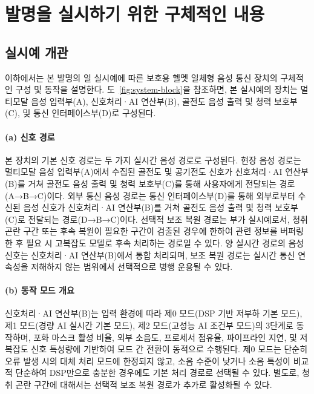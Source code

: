 \documentclass{article}
\DeclareRobustCommand{\codexedit}[1]{\textcolor{customorange}{#1}}
\begin{document}
\clearpage

\section{발명을 실시하기 위한 구체적인 내용}


\subsection{실시예 개관}

이하에서는 본 발명의 일 실시예에 따른 보호용 헬멧 일체형 음성 통신 장치의 구체적인 구성 및 동작을 설명한다. 도~\ref{fig:system-block}을 참조하면, 본 실시예의 장치는 멀티모달 음성 입력부(A), 신호처리·AI 연산부(B), 골전도 음성 출력 및 청력 보호부(C), 및 통신 인터페이스부(D)로 구성된다.

\paragraph{(a) 신호 경로}

\codexedit{본 장치의 기본 신호 경로는 두 가지 실시간 음성 경로로 구성된다. 현장 음성 경로는 멀티모달 음성 입력부(A)에서 수집된 골전도 및 공기전도 신호가 신호처리·AI 연산부(B)를 거쳐 골전도 음성 출력 및 청력 보호부(C)를 통해 사용자에게 전달되는 경로(A→B→C)이다. 외부 통신 음성 경로는 통신 인터페이스부(D)를 통해 외부로부터 수신된 음성 신호가 신호처리·AI 연산부(B)를 거쳐 골전도 음성 출력 및 청력 보호부(C)로 전달되는 경로(D→B→C)이다. 선택적 보조 복원 경로는 부가 실시예로서, 청취 곤란 구간 또는 후속 복원이 필요한 구간이 검출된 경우에 한하여 관련 정보를 버퍼링한 후 필요 시 고복잡도 모델로 후속 처리하는 경로일 수 있다. 양 실시간 경로의 음성 신호는 신호처리·AI 연산부(B)에서 통합 처리되며, 보조 복원 경로는 실시간 통신 연속성을 저해하지 않는 범위에서 선택적으로 병행 운용될 수 있다.}

\paragraph{(b) 동작 모드 개요}

\codexedit{신호처리·AI 연산부(B)는 입력 환경에 따라 제0 모드(DSP 기반 저부하 기본 모드), 제1 모드(경량 AI 실시간 기본 모드), 제2 모드(고성능 AI 조건부 모드)의 3단계로 동작하며, 포화 마스크 활성 비율, 외부 소음도, 프로세서 점유율, 파이프라인 지연, 및 저복잡도 신호 특성량에 기반하여 모드 간 전환이 동적으로 수행된다. 제0 모드는 단순히 오류 발생 시의 대체 처리 모드에 한정되지 않고, 소음 수준이 낮거나 소음 특성이 비교적 단순하여 DSP만으로 충분한 경우에도 기본 처리 경로로 선택될 수 있다. 별도로, 청취 곤란 구간에 대해서는 선택적 보조 복원 경로가 추가로 활성화될 수 있다.}
\end{document}
